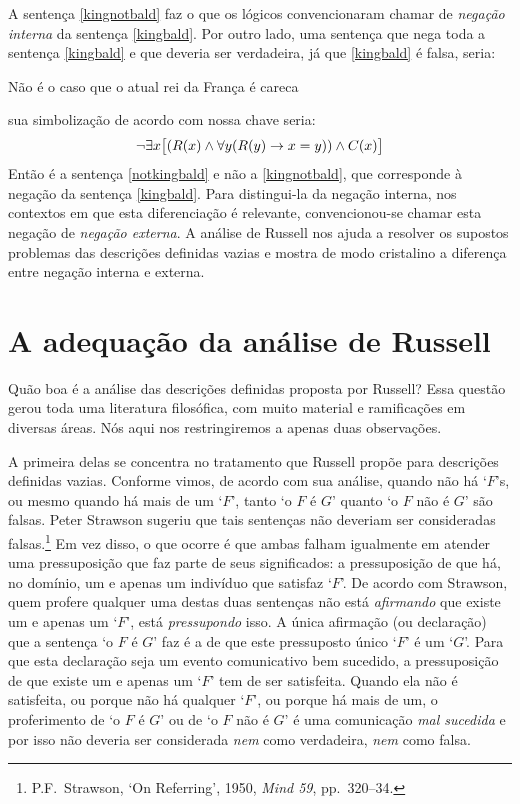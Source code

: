 A sentença \ref{kingnotbald} faz o que os lógicos convencionaram chamar de  \emph{negação interna} da sentença \ref{kingbald}.
Por outro lado, uma sentença que nega toda a sentença \ref{kingbald} e que deveria ser verdadeira, já que \ref{kingbald} é falsa, seria:
	\begin{earg}
		\item[\ex{notkingbald}] Não é o caso que o atual rei da França é careca
	\end{earg}
sua simbolização de acordo com nossa chave seria:
$$\neg\exists x \bigl[(\mathord{R}(x) \wedge \forall y (\mathord{R}(y) \rightarrow x = y)) \wedge \mathord{C}(x)\bigr]$$
Então é a sentença \ref{notkingbald} e não a \ref{kingnotbald}, que corresponde à negação da sentença \ref{kingbald}.
Para distingui-la da negação interna, nos contextos em que esta diferenciação é relevante, convencionou-se chamar esta negação de \emph{negação externa}.
A análise de Russell nos ajuda a resolver os supostos problemas das descrições definidas vazias e mostra de modo cristalino a diferença entre negação interna e externa.


\section{A adequação da análise de Russell}
Quão boa é a análise das descrições definidas proposta por Russell?
Essa questão gerou toda uma literatura filosófica, com muito material e ramificações em diversas áreas.
Nós aqui nos restringiremos a apenas duas observações.

A primeira delas se concentra no tratamento que Russell propõe para descrições definidas vazias.
Conforme vimos, de acordo com sua análise, quando não há `$F$'s, ou mesmo quando há mais de um `$F$', tanto `o $F$ é $G$' quanto `o $F$ não é $G$' são falsas.
Peter Strawson sugeriu que tais sentenças não deveriam ser consideradas falsas.\footnote{
	P.F.\ Strawson, `On Referring', 1950, \emph{Mind 59}, pp.\ 320--34.}
Em vez disso, o que ocorre é que ambas falham igualmente em atender uma pressuposição que faz parte de seus significados: a pressuposição de que há, no domínio, um e apenas um indivíduo que satisfaz `$F$'.
De acordo com Strawson, quem profere qualquer uma destas duas sentenças não está \emph{afirmando} que existe um e apenas um `$F$', está \emph{pressupondo} isso. A única afirmação (ou declaração) que a sentença `o $F$ é $G$' faz é a de que este pressuposto único `$F$' é um `$G$'.
Para que esta declaração seja um evento comunicativo bem sucedido, a pressuposição de que existe um e apenas um `$F$' tem de ser satisfeita.
Quando ela não é satisfeita, ou porque não há qualquer `$F$', ou porque há mais de um, o proferimento de `o $F$ é $G$' ou de `o $F$ não é $G$' é uma comunicação \emph{mal sucedida} e por isso não deveria ser considerada \emph{nem} como verdadeira, \emph{nem} como falsa.

